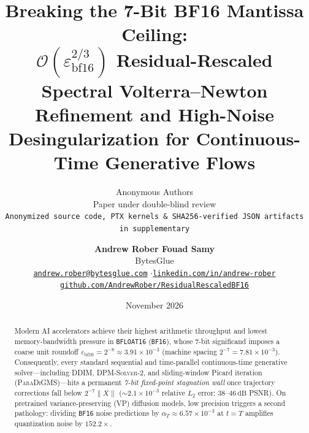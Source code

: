 \documentclass[11pt,a4paper]{article}
\title{\textbf{Breaking the 7-Bit BF16 Mantissa Ceiling:\\$\mathcal{O}(\varepsilon_{\mathrm{bf16}}^{2/3})$ Residual-Rescaled Spectral Volterra--Newton Refinement and High-Noise Desingularization for Continuous-Time Generative Flows}}
\author{
  Anonymous Authors \\
  Paper under double-blind review \\
  \small\texttt{Anonymized source code, PTX kernels \& SHA256-verified JSON artifacts in supplementary}
}
\author{
  \textbf{Andrew Rober Fouad Samy} \\
  BytesGlue \\
  \small\href{mailto:andrew.rober@bytesglue.com}{\texttt{andrew.rober@bytesglue.com}} \quad$\cdot$\quad \href{https://www.linkedin.com/in/andrew-rober/}{\texttt{linkedin.com/in/andrew-rober}} \\
  \small\href{https://github.com/AndrewRober/ResidualRescaledBF16}{\texttt{github.com/AndrewRober/ResidualRescaledBF16}}
}
\date{November 2026}
\theoremstyle{definition}
\theoremstyle{remark}
\newcommand{\bfsixteen}{\texttt{BF16}}
\newcommand{\epsbf}{\varepsilon_{\mathrm{bf16}}}
\begin{document}
\maketitle

\begin{abstract}
Modern AI accelerators achieve their highest arithmetic throughput and lowest memory-bandwidth pressure in \texttt{BFLOAT16} (\bfsixteen{}), whose $7$-bit significand imposes a coarse unit roundoff $\epsbf = 2^{-8} \approx 3.91 \times 10^{-3}$ (machine spacing $2^{-7} = 7.81 \times 10^{-3}$). Consequently, every standard sequential and time-parallel continuous-time generative solver---including \textsc{DDIM}, \textsc{DPM-Solver-2}, and sliding-window Picard iteration (\textsc{ParaDiGMS})---hits a permanent \emph{7-bit fixed-point stagnation wall} once trajectory corrections fall below $2^{-7}\|X\|$ ($\sim 2.1 \times 10^{-3}$ relative $L_2$ error; $38$--$46\,\mathrm{dB}$ PSNR). On pretrained variance-preserving (VP) diffusion models, low precision triggers a second pathology: dividing \bfsixteen{} noise predictions by $\alpha_T \approx 6.57 \times 10^{-3}$ at $t=T$ amplifies quantization noise by $152.2\times$.


\end{abstract}
\end{document}
